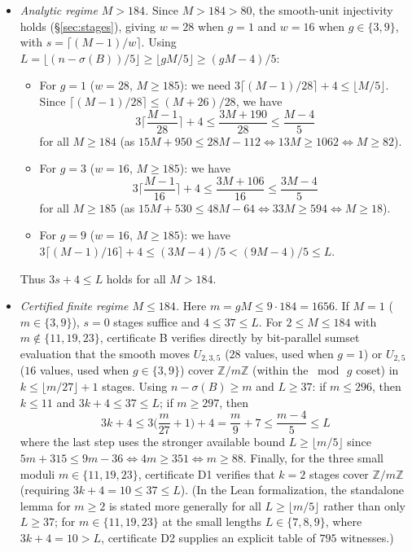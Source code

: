 \documentclass[11pt]{article}
\theoremstyle{remark}
\newcommand{\Z}{\mathbb{Z}}
\newcommand{\sig}{\sigma}
\begin{document}
\begin{itemize}
\item \emph{Analytic regime $M > 184$.} Since $M > 184 > 80$, the smooth-unit
injectivity holds (\S\ref{sec:stages}), giving $w = 28$ when $g = 1$ and
$w = 16$ when $g \in \{3,9\}$, with $s = \lceil (M-1)/w \rceil$. Using
$L = \lfloor (n - \sig(B))/5 \rfloor \ge \lfloor gM/5 \rfloor \ge (gM - 4)/5$:
\begin{itemize}
\item For $g = 1$ ($w = 28$, $M \ge 185$): we need
$3\lceil (M-1)/28 \rceil + 4 \le \lfloor M/5 \rfloor$. Since
$\lceil (M-1)/28 \rceil \le (M + 26)/28$, we have
\[
 3\Big\lceil \frac{M-1}{28} \Big\rceil + 4 \le \frac{3M + 190}{28} \le \frac{M - 4}{5}
\]
for all $M \ge 184$ (as $15M + 950 \le 28M - 112 \iff 13M \ge 1062 \iff M \ge 82$).
\item For $g = 3$ ($w = 16$, $M \ge 185$): we have
\[
 3\Big\lceil \frac{M-1}{16} \Big\rceil + 4 \le \frac{3M + 106}{16} \le \frac{3M - 4}{5}
\]
for all $M \ge 185$ (as $15M + 530 \le 48M - 64 \iff 33M \ge 594 \iff M \ge 18$).
\item For $g = 9$ ($w = 16$, $M \ge 185$): we have
$3\lceil (M-1)/16 \rceil + 4 \le (3M - 4)/5 < (9M - 4)/5 \le L$.
\end{itemize}
Thus $3s + 4 \le L$ holds for all $M > 184$.

\item \emph{Certified finite regime $M \le 184$.} Here $m = gM \le 9 \cdot 184 = 1656$.
If $M = 1$ ($m \in \{3,9\}$), $s = 0$ stages suffice and $4 \le 37 \le L$. For
$2 \le M \le 184$ with $m \notin \{11,19,23\}$, certificate B verifies directly
by bit-parallel sumset evaluation that the smooth moves $U_{2,3,5}$ ($28$ values,
used when $g = 1$) or $U_{2,5}$ ($16$ values, used when $g \in \{3,9\}$) cover
$\Z/m\Z$ (within
the $\bmod\, g$ coset) in $k \le \lfloor m/27 \rfloor + 1$ stages. Using
$n - \sig(B) \ge m$ and $L \ge 37$: if $m \le 296$, then $k \le 11$ and
$3k + 4 \le 37 \le L$; if $m \ge 297$, then
\[
 3k + 4 \le 3\Big(\frac{m}{27} + 1\Big) + 4 = \frac{m}{9} + 7 \le \frac{m - 4}{5} \le L
\]
where the last step uses the stronger available bound $L \ge \lfloor m/5 \rfloor$
since $5m + 315 \le 9m - 36 \iff 4m \ge 351 \iff m \ge 88$. Finally, for the
three small moduli $m \in \{11,19,23\}$, certificate D1 verifies that $k = 2$
stages cover $\Z/m\Z$ (requiring $3k + 4 = 10 \le 37 \le L$). (In the Lean
formalization, the standalone lemma for $m \ge 2$ is stated more generally for
all $L \ge \lfloor m/5 \rfloor$ rather than only $L \ge 37$; for
$m \in \{11,19,23\}$ at the small lengths $L \in \{7,8,9\}$, where $3k+4=10 > L$,
certificate D2 supplies an explicit table of $795$ witnesses.)
\end{itemize}
\end{document}
